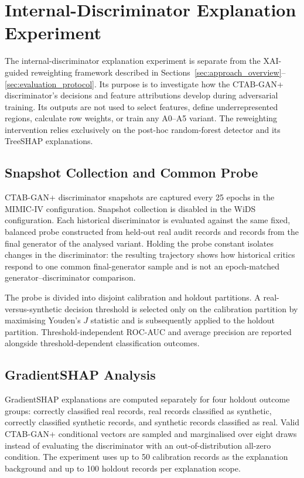 \section{Internal-Discriminator Explanation Experiment}
\label{sec:internal_discriminator_experiment}

The internal-discriminator explanation experiment is separate from the
XAI-guided reweighting framework described in
Sections~\ref{sec:approach_overview}--\ref{sec:evaluation_protocol}. Its purpose
is to investigate how the CTAB-GAN+ discriminator's decisions and feature
attributions develop during adversarial training. Its outputs are not used to
select features, define underrepresented regions, calculate row weights, or
train any A0--A5 variant. The reweighting intervention relies exclusively on
the post-hoc random-forest detector and its TreeSHAP explanations.

\subsection{Snapshot Collection and Common Probe}

CTAB-GAN+ discriminator snapshots are captured every 25 epochs in the
MIMIC-IV configuration. Snapshot collection is disabled in the WiDS
configuration. Each historical discriminator is evaluated against the same
fixed, balanced probe constructed from held-out real audit records and records
from the final generator of the analysed variant. Holding the probe constant
isolates changes in the discriminator: the resulting trajectory shows how
historical critics respond to one common final-generator sample and is not an
epoch-matched generator--discriminator comparison.

The probe is divided into disjoint calibration and holdout partitions. A
real-versus-synthetic decision threshold is selected only on the calibration
partition by maximising Youden's $J$ statistic and is subsequently applied to
the holdout partition. Threshold-independent ROC-AUC and average precision are
reported alongside threshold-dependent classification outcomes.

\subsection{GradientSHAP Analysis}

GradientSHAP explanations are computed separately for four holdout outcome
groups: correctly classified real records, real records classified as
synthetic, correctly classified synthetic records, and synthetic records
classified as real. Valid CTAB-GAN+ conditional vectors are sampled and
marginalised over eight draws instead of evaluating the discriminator with an
out-of-distribution all-zero condition. The experiment uses up to 50
calibration records as the explanation background and up to 100 holdout records
per explanation scope.


